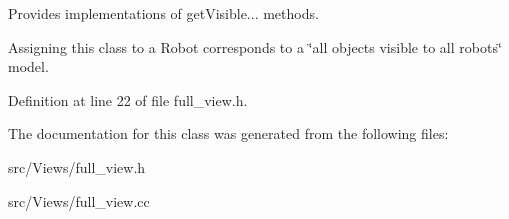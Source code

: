 Provides implementations of getVisible... methods.

Assigning this class to a Robot corresponds to a \char`\"{}all objects visible to all robots\char`\"{} model. 

Definition at line 22 of file full\_\-view.h.

The documentation for this class was generated from the following files:\begin{CompactItemize}
\item 
src/Views/full\_\-view.h\item 
src/Views/full\_\-view.cc\end{CompactItemize}
